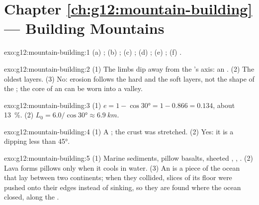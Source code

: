 \section*{Chapter \ref{ch:g12:mountain-building} --- Building Mountains}

\begin{solution}{exo:g12:mountain-building:1}
(a) ; (b) ; (c) ; (d) ; (e) ;
(f) .
\end{solution}

\begin{solution}{exo:g12:mountain-building:2}
(1) The limbs dip away from the 's axis: an . (2) The oldest
layers. (3) No: erosion follows the hard and the soft layers, not the shape
of the ; the core of an  can be worn into a valley.
\end{solution}

\begin{solution}{exo:g12:mountain-building:3}
(1) $e = 1 - \cos\ang{30} = 1 - 0.866 = 0.134$, about \qty{13}{\percent}.
(2) $L_0 = 6.0/\cos\ang{30} \approx \qty{6.9}{km}$.
\end{solution}

\begin{solution}{exo:g12:mountain-building:4}
(1) A ; the crust was stretched. (2) Yes: it is a 
dipping less than \ang{45}.
\end{solution}

\begin{solution}{exo:g12:mountain-building:5}
(1) Marine sediments, pillow basalts, sheeted , , .
(2) Lava forms pillows only when it cools in water. (3) An  is a
piece of the ocean that lay between two continents; when they collided,
slices of its floor were pushed onto their edges instead of sinking, so they
are found where the ocean closed, along the .
\end{solution}


